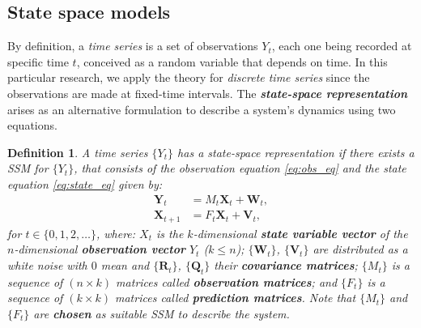 \documentclass{article}
\newtheorem{definition}[theorem]{Definition}
\theoremstyle{definition}
\theoremstyle{definition}
\theoremstyle{remark}
\theoremstyle{mythmstyle}
\begin{document}
\subsection{State space models}

By definition, a \textit{time series} is a set of observations $Y_t$, each one being recorded at specific time $t$, conceived as a random variable that depends on time. In this particular research, we apply the theory for \textit{discrete time series} since the observations are made at fixed-time intervals.
The \textbf{\textit{state-space representation}} arises as an alternative formulation to describe a system's dynamics using two equations. 
 
\begin{definition}
A time series $\{Y_t\}$ has a state-space representation if there exists a SSM for $\{Y_t\}$, that consists of the observation equation \ref{eq:obs_eq} and the state equation \ref{eq:state_eq} given by:
\begin{align}
    \textbf{Y}_t &= M_t \textbf{X}_t + \textbf{W}_t, \label{eq:obs_eq}
    \\
    \textbf{X}_{t+1} &= F_t \textbf{X}_t + \textbf{V}_t, \label{eq:state_eq}
\end{align}
for $t \in \{0, 1, 2, \dots\}$,  where: $X_t$ is the $k$-dimensional \textbf{state variable vector} of the $n$-dimensional \textbf{observation vector} $Y_t$ ($k\leq n$); $\{\textbf{W}_t\}$, $\{\textbf{V}_t\}$ are distributed as a white noise with $0$ mean and $\{\textbf{R}_t\}$, $\{\textbf{Q}_t\}$ their \textbf{covariance matrices}; $\{ M_t\}$ is a sequence of $(n \times k)$ matrices called \textbf{observation matrices}; and $\{F_t\}$ is a sequence of $(k \times k)$ matrices called \textbf{prediction matrices}. Note that $\{ M_t\}$ and $\{F_t\}$ are \textbf{chosen} as suitable SSM to describe the system.
\end{definition}
\end{document}
